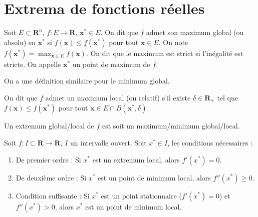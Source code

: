 \chapter{Extrema de fonctions réelles}
\begin{definition}
Soit $E\subset \mathbf{R}^{n}$, $f:E\to \mathbf{R}$, $\boldsymbol{x}^{*}\in E$. On dit que $f$ admet son maximum global (ou absolu) en $\boldsymbol{x}^{*}$ si $f(\boldsymbol{x})\le f(\boldsymbol{x}^{*})$ pour tout $\boldsymbol{x}\in E$. On note $f(\boldsymbol{x}^{*})=\max_{\boldsymbol{x}\in E}f(\boldsymbol{x})$. On dit que le maximum est strict si l'inégalité est stricte. On appelle $\boldsymbol{x}^{*}$ un point de maximum de $f$.

On a une définition similaire pour le minimum global.

On dit que $f$ admet un maximum local (ou relatif) s'il existe $\delta \in \mathbf{R}_{+}$ tel que $f(\boldsymbol{x})\le f(\boldsymbol{x}^{*})$ pour tout $\boldsymbol{x}\in E\cap B(\boldsymbol{x}^{*},\delta)$.

\end{definition}
\begin{definition}
Un extremum global/local de $f$ est soit un maximum/minimum global/local.
\end{definition}

\begin{reminder}[D'Analyse I]
Soit $f:I\subset \mathbf{R}\to \mathbf{R}$, $I$ un intervalle ouvert. Soit $x^{*}\in I$, les conditions nécessaires :
\begin{enumerate}
\item De premier ordre : Si $x^{*}$ est un extremum local, alors $f'(x^{*})=0$.
\item De deuxième ordre : Si $x^{*}$ est un point de minimum local, alors $f''(x^{*})\ge 0$. 
\item Condition suffisante : Si $x^{*}$ est un point stationnaire ($f'(x^{*})=0$) et $f''(x^{*})>0$, alors $x^{*}$ est un point de minimum local. 
\end{enumerate}
\end{reminder}

